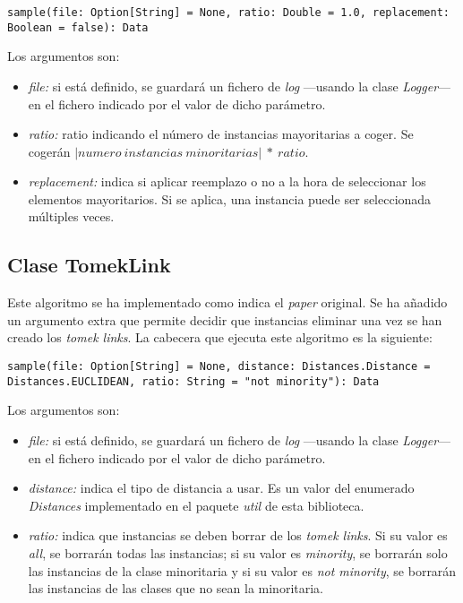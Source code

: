 \begin{lstlisting}[frame=single, basicstyle=\scriptsize, breaklines=true]
sample(file: Option[String] = None, ratio: Double = 1.0, replacement: Boolean = false): Data
\end{lstlisting}

Los argumentos son:

\begin{itemize}
    \item \textit{file:} si está definido, se guardará un fichero de \textit{log} —usando la clase \textit{Logger}— en el fichero indicado por el valor de dicho parámetro.
    \item \textit{ratio:} ratio indicando el número de instancias mayoritarias a coger. Se cogerán $\left | numero\ instancias\ minoritarias \right | \ *\ ratio$.
    \item \textit{replacement:} indica si aplicar reemplazo o no a la hora de seleccionar los elementos mayoritarios. Si se aplica, una instancia puede ser seleccionada múltiples veces.
\end{itemize}

\subsection{Clase TomekLink} \label{subsec:impl_tomeklink}

Este algoritmo se ha implementado como indica el \textit{paper} original. Se ha añadido un argumento extra que permite decidir que instancias eliminar una vez se han creado los \textit{tomek links}. La cabecera que ejecuta este algoritmo es la siguiente:

\begin{lstlisting}[frame=single, basicstyle=\scriptsize, breaklines=true]
sample(file: Option[String] = None, distance: Distances.Distance = Distances.EUCLIDEAN, ratio: String = "not minority"): Data
\end{lstlisting}

Los argumentos son:

\begin{itemize}
    \item \textit{file:} si está definido, se guardará un fichero de \textit{log} —usando la clase \textit{Logger}— en el fichero indicado por el valor de dicho parámetro.
    \item \textit{distance:} indica el tipo de distancia a usar. Es un valor del enumerado \textit{Distances} implementado en el paquete \textit{util} de esta biblioteca.
    \item \textit{ratio:} indica que instancias se deben borrar de los \textit{tomek links}. Si su valor es \textit{all}, se borrarán todas las instancias; si su valor es \textit{minority}, se borrarán solo las instancias de la clase minoritaria y si su valor es \textit{not minority}, se borrarán las instancias de las clases que no sean la minoritaria.
\end{itemize}

